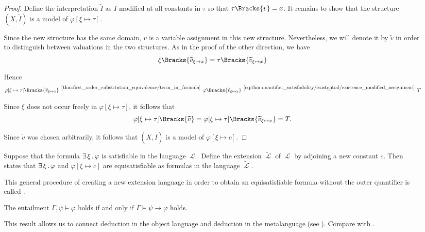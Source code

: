 \begin{proof}
  Define the interpretation \( \widetilde I \) as \( I \) modified at all constants in \( \tau \) so that \( \tau\Bracks{v} = x \). It remains to show that the structure \( (X, \widetilde I) \) is a model of \( \varphi[\xi \mapsto \tau] \).

  Since the new structure has the same domain, \( v \) is a variable assignment in this new structure. Nevertheless, we will denote it by \( \widetilde v \) in order to distinguish between valuations in the two structures. As in the proof of the other direction, we have
  \begin{equation*}
    \xi\Bracks{\widetilde v_{\xi \mapsto x}}
    =
    \tau\Bracks{\widetilde v_{\xi \mapsto x}}
  \end{equation*}

  Hence
  \begin{equation*}
    \varphi[\xi \mapsto \tau]\Bracks{\widetilde v_{\xi \mapsto x}}
    \reloset {\ref{thm:first_order_substitution_equivalence/term_in_formula}} =
    \varphi\Bracks{\widetilde v_{\xi \mapsto x}}
    \reloset {\eqref{eq:thm:quantifier_satisfiability/existential/existence_modified_assignment}} =
    T
  \end{equation*}

  Since \( \xi \) does not occur freely in \( \varphi[\xi \mapsto \tau] \), it follows that
  \begin{equation*}
    \varphi[\xi \mapsto \tau]\Bracks{\widetilde v} = \varphi[\xi \mapsto \tau]\Bracks{\widetilde v_{\xi \mapsto x}} = T.
  \end{equation*}

  Since \( \widetilde v \) was chosen arbitrarily, it follows that \( (X, \widetilde I) \) is a model of \( \varphi[\xi \mapsto c] \).
\end{proof}

\begin{remark}\label{rem:existential_quantifier_removal}
  Suppose that the formula \( \exists \thinspace \xi \thinspace . \thinspace \varphi \) is satisfiable in the language \( \mscrL \). Define the extension \( \widetilde \mscrL \)  of \( \mscrL \) by adjoining a new constant \( c \). Then  states that \( \exists \thinspace \xi \thinspace . \thinspace \varphi \) and \( \varphi[\xi \mapsto c] \) are equisatisfiable as formulas in the language \( \widetilde \mscrL \).

  This general procedure of creating a new extension language in order to obtain an equisatisfiable formula without the outer quantifier is called .
\end{remark}

\begin{theorem}\label{thm:semantic_deduction_theorem}
  The entailment \( \Gamma, \psi \vDash \varphi \) holds if and only if \( \Gamma \vDash \psi \to \varphi \) holds.

  This result allows us to connect deduction in the object language and deduction in the metalanguage (see ). Compare with .
\end{theorem}
